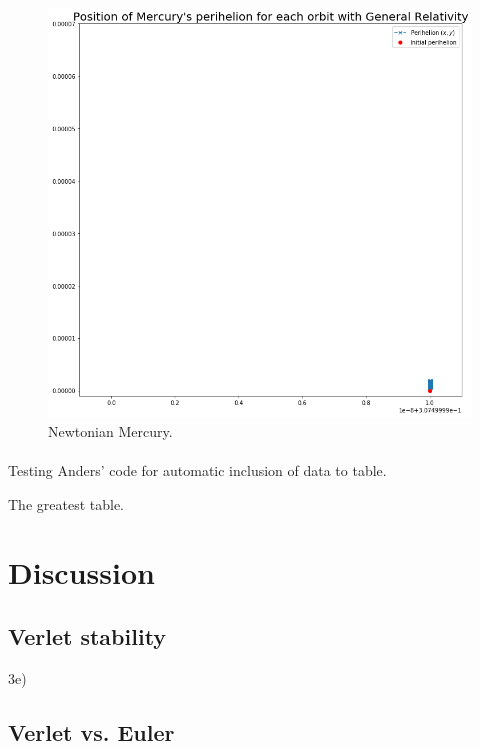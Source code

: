 \documentclass[a4paper, fontsize=11pt]{article}
\begin{document}
\begin{figure}[H]
\includegraphics[scale=0.5]{plots/NewtonianMercury}
\caption{Newtonian Mercury.}
\label{fig:NewtonianMercury}
\end{figure}

\paragraph{}
Testing Anders' code for automatic inclusion of data to table.
\begin{table}[h!tb]
    \centering
    \caption{The greatest table.}
\end{table}





\section{Discussion}
\subsection{Verlet stability}
3e)

\subsection{Verlet vs. Euler} 





\end{document}
